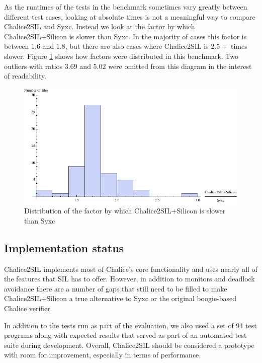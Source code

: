 As the runtimes of the tests in the benchmark sometimes vary greatly between different test cases, looking at absolute times is not a meaningful way to compare Chalice2SIL and Syxc. 
Instead we look at the factor by which Chalice2SIL+Silicon is slower than Syxc. 
In the majority of cases this factor is between $1.6$ and $1.8$, but there are also cases where Chalice2SIL is $2.5+$ times slower.
Figure \ref{fig:full-ratio-distribution} shows how factors were distributed in this benchmark. 
Two outliers with ratios $3.69$ and $5.02$ were omitted from this diagram in the interest of readability.

\begin{figure}
\includegraphics[width=145mm]{src/data/full-ratio-distribution.pdf}
\caption{Distribution of the factor by which Chalice2SIL+Silicon is slower than Syxc}\label{fig:full-ratio-distribution}
\end{figure}

\subsection{Implementation status}
Chalice2SIL implements most of Chalice's core functionality and uses nearly all of the features that SIL has to offer.
However, in addition to monitors and deadlock avoidance there are a number of gaps that still need to be filled to make Chalice2SIL+Silicon a true alternative to Syxc or the original boogie-based Chalice verifier.

In addition to the tests run as part of the evaluation, we also used a set of 94 test programs along with expected results that served as part of an automated test suite during development.
Overall, Chalice2SIL should be considered a prototype with room for improvement, especially in terms of performance. 
